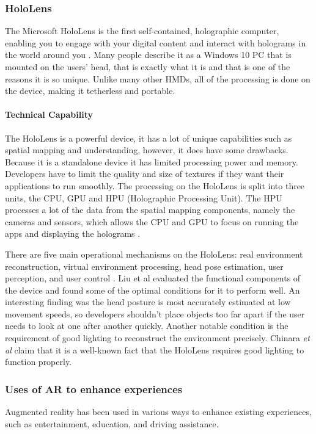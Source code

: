 \documentclass[journal]{IEEEtran}
\begin{document}
\subsubsection{HoloLens} \label{HoloLens}
The Microsoft HoloLens is the first self-contained, holographic computer, enabling you to engage with your digital content and interact with holograms in the world around you \cite{microsoft_HoloLens}. Many people describe it as a Windows 10 PC that is mounted on the users' head, that is exactly what it is and that is one of the reasons it is so unique. Unlike many other HMDs, all of the processing is done on the device, making it tetherless and portable.
\paragraph{Technical Capability} \label{technical capability}
 The HoloLens is a powerful device, it has a lot of unique capabilities such as spatial mapping and understanding, however, it does have some drawbacks. Because it is a standalone device it has limited processing power and memory. Developers have to limit the quality and size of textures \cite{dong_real-time_2018} if they want their applications to run smoothly. The processing on the HoloLens is split into three units, the CPU, GPU and HPU (Holographic Processing Unit). The HPU processes a lot of the data from the spatial mapping components, namely the cameras and sensors, which allows the CPU and GPU to focus on running the apps and displaying the holograms \cite{chinara_arnold:_2017}. 
 
 There are five main operational mechanisms on the HoloLens: real environment reconstruction, virtual environment processing, head pose estimation, user perception, and user control \cite{liu_technical_2018}. Liu et al evaluated the functional components of the device and found some of the optimal conditions for it to perform well. An interesting finding was the head posture is most accurately estimated at low movement speeds, so developers shouldn't place objects too far apart if the user needs to look at one after another quickly. Another notable condition is the requirement of good lighting to reconstruct the environment precisely. Chinara \textit{et al} \cite{chinara_arnold:_2017} claim that it is a well-known fact that the HoloLens requires good lighting to function properly. 

\subsubsection{Uses of AR to enhance experiences} \label{AR uses}
Augmented reality has been used in various ways to enhance existing experiences, such as entertainment, education, and driving assistance.
\end{document}
